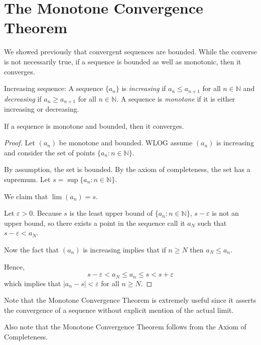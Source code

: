  


\smallskip

\section{The Monotone Convergence Theorem }
We showed previously that convergent sequences are bounded.  While the converse is not necessarily true, if a sequence is bounded as well as monotonic, then it converges.


\begin{definition}Increasing sequence:  A sequence $\{a_{n}\}$ is \emph{increasing} if $a_{n} \leq a_{n+1}$ for all $n \in \mathbb{N}$ and \emph{decreasing} if $a_{n} \geq a_{n+1}$ for all $n \in \mathbb{N}$.  A sequence is \emph{monotone} if it is either increasing or decreasing. \end{definition}

\begin{theorem}   If a sequence is monotone and bounded, then it converges.
\end{theorem}

\begin{proof}
	Let $(a_n)$ be monotone and bounded.
	WLOG assume $(a_n)$  is increasing and consider the set of points $\{a_n : n \in \mathbb{N}\}$.
	
	By assumption, the set is bounded.  By the axiom of completeness, the set has a supremum.  Let $s = \sup\{a_n : n \in \mathbb{N}\}$.
	
	We claim that $\lim (a_n) = s$.
	
	Let $\varepsilon > 0$.  Because $s$ is the least upper bound of $\{a_n : n \in \mathbb{N}\}$, $s- \varepsilon$ is not an upper bound, so there exists  a point in the sequence call it $a_N$ such that $s-\varepsilon < a_N$.
	
	Now the fact that $(a_n)$ is increasing implies that if $n \geq N$ then $a_N \leq a_n$.
	
	Hence,
	$$ s- \varepsilon < a_N \leq a_n \leq s < s+\varepsilon $$
	which implies that $|a_n  - s| < \varepsilon$ for all $n \geq N$.
\end{proof}

Note that the Monotone Convergence Theorem is extremely useful since it asserts the convergence of a sequence without explicit mention of the actual limit.

Also note that the Monotone Convergence Theorem follows from the Axiom of Completeness.

